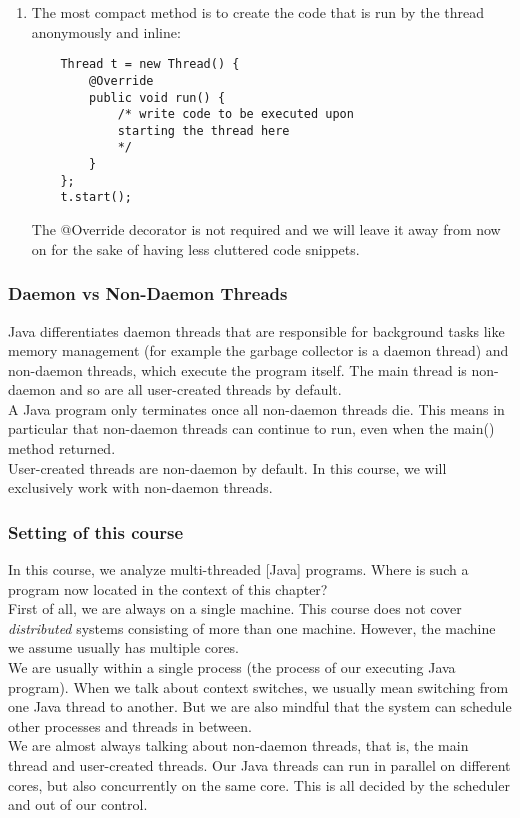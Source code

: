 \documentclass[main]{subfiles}
\begin{document}
\begin{enumerate}
    \item The most compact method is to create the code that is run by the thread anonymously and inline:
    \begin{verbatim}
    Thread t = new Thread() {
        @Override
        public void run() {
            /* write code to be executed upon
            starting the thread here
            */
        }
    };
    t.start();
    \end{verbatim}
    The @Override decorator is not required and we will leave it away from now on for the sake of having less cluttered code snippets.
\end{enumerate}

\subsubsection{Daemon vs Non-Daemon Threads}
Java differentiates daemon threads that are responsible for background tasks like memory management (for example the garbage collector is a daemon thread) and non-daemon threads, which execute the program itself. The main thread is non-daemon and so are all user-created threads by default.\\
A Java program only terminates once all non-daemon threads die. This means in particular that non-daemon threads can continue to run, even when the main() method returned.\\
User-created threads are non-daemon by default. In this course, we will exclusively work with non-daemon threads.

\subsubsection{Setting of this course}
In this course, we analyze multi-threaded [Java] programs. Where is such a program now located in the context of this chapter?\\
First of all, we are always on a single machine. This course does not cover \textit{distributed} systems consisting of more than one machine. However, the machine we assume usually has multiple cores.\\
We are usually within a single process (the process of our executing Java program). When we talk about context switches, we usually mean switching from one Java thread to another. But we are also mindful that the system can schedule other processes and threads in between.\\
We are almost always talking about non-daemon threads, that is, the main thread and user-created threads. Our Java threads can run in parallel on different cores, but also concurrently on the same core. This is all decided by the scheduler and out of our control.
\end{document}
